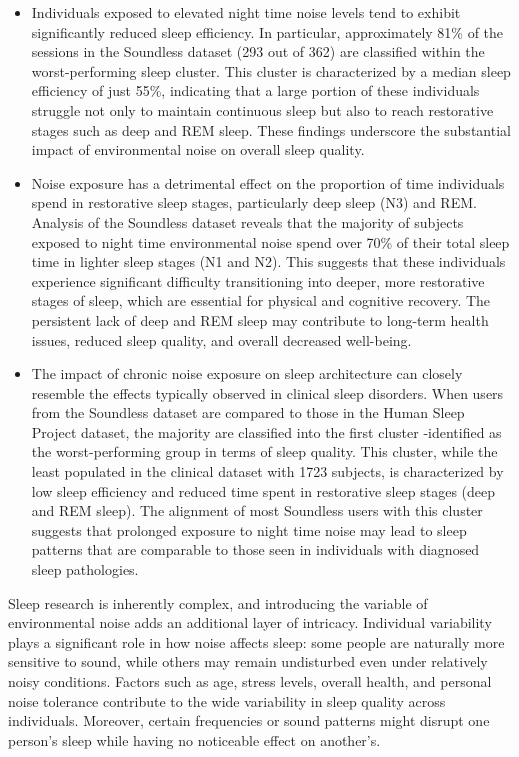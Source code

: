 \begin{itemize}
	\item Individuals exposed to elevated night time noise levels tend to exhibit significantly reduced sleep efficiency. In particular, approximately 81\% of the sessions in the Soundless dataset (293 out of 362) are classified within the worst-performing sleep cluster. This cluster is characterized by a median sleep efficiency of just 55\%, indicating that a large portion of these individuals struggle not only to maintain continuous sleep but also to reach restorative stages such as deep and REM sleep. These findings underscore the substantial impact of environmental noise on overall sleep quality. 
	\item Noise exposure has a detrimental effect on the proportion of time individuals spend in restorative sleep stages, particularly deep sleep (N3) and REM. Analysis of the Soundless dataset reveals that the majority of subjects exposed to night time environmental noise spend over 70\% of their total sleep time in lighter sleep stages (N1 and N2). This suggests that these individuals experience significant difficulty transitioning into deeper, more restorative stages of sleep, which are essential for physical and cognitive recovery. The persistent lack of deep and REM sleep may contribute to long-term health issues, reduced sleep quality, and overall decreased well-being.
	\item The impact of chronic noise exposure on sleep architecture can closely resemble the effects typically observed in clinical sleep disorders. When users from the Soundless dataset are compared to those in the Human Sleep Project dataset, the majority are classified into the first cluster -identified as the worst-performing group in terms of sleep quality. This cluster, while the least populated in the clinical dataset with 1723 subjects, is characterized by low sleep efficiency and reduced time spent in restorative sleep stages (deep and REM sleep). The alignment of most Soundless users with this cluster suggests that prolonged exposure to night time noise may lead to sleep patterns that are comparable to those seen in individuals with diagnosed sleep pathologies.
\end{itemize}

Sleep research is inherently complex, and introducing the variable of environmental noise adds an additional layer of intricacy. Individual variability plays a significant role in how noise affects sleep: some people are naturally more sensitive to sound, while others may remain undisturbed even under relatively noisy conditions. Factors such as age, stress levels, overall health, and personal noise tolerance contribute to the wide variability in sleep quality across individuals. Moreover, certain frequencies or sound patterns might disrupt one person's sleep while having no noticeable effect on another's.

